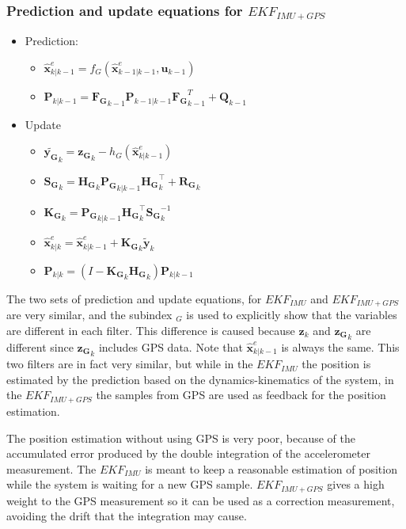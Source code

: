 \documentclass[conference]{IEEEtran}
\begin{document}
\subsubsection{Prediction and update equations for $EKF_{IMU+GPS}$}
\begin{itemize}
	\item Prediction:
	\begin{itemize}
		\item $\hat{\mathbf{x}}_{k|k-1}^e = f_{G}(\hat{\mathbf{x}}_{k-1|k-1}^e, \mathbf{u}_{k-1})$
		\item $ \mathbf{P}_{k|k-1} =  {{\mathbf{F_{G}}_{k-1}}} \mathbf{P}_{k-1|k-1}{  {\mathbf{F_{G}}_{k-1}^T}} + \mathbf{Q}_{k-1} $
	\end{itemize}
	\item Update
	\begin{itemize}
		\item $\mathbf{\tilde{y_G}}_{k} = \mathbf{z_{G}}_{k} - h_G(\hat{\mathbf{x}}_{k|k-1}^e)$
		\item $\mathbf{S_{G}}_{k} = { \mathbf{H_{G}}_{k}}\mathbf{P_{G}}_{k|k-1}{ \mathbf{H_{G}}_{k}^\top} + \mathbf{R_{G}}_{k}$
		\item $\mathbf{K_{G}}_{k} = \mathbf{P_{G}}_{k|k-1}{ \mathbf{H_{G}}_{k}^\top}\mathbf{S_{G}}_{k}^{-1} $
		\item $\hat{\mathbf{x}}_{k|k}^e = \hat{\mathbf{x}}_{k|k-1}^e + \mathbf{K_{G}}_{k}\tilde{\mathbf{y}}_{k} $
		\item $ \mathbf{P}_{k|k} = (I - \mathbf{K_{G}}_{k} { \mathbf{H_{G}}_{k}}) \mathbf{P}_{k|k-1} $
	\end{itemize}
\end{itemize}
The two sets of prediction and update equations, for $EKF_{IMU}$ and $EKF_{IMU+GPS}$ are very similar, and the subindex $_G$ is used to explicitly show that the variables are different in each filter. This difference is caused because $\mathbf{z}_{k}$ and $\mathbf{z_G}_{k}$ are different since $\mathbf{z_G}_{k}$ includes GPS data. Note that $\hat{\mathbf{x}}_{k|k-1}^e$ is always the same. This two filters are in fact very similar, but while in the $EKF_{IMU}$ the position is estimated by the prediction based on the dynamics-kinematics of the system, in the $EKF_{IMU+GPS}$ the samples from GPS are used as feedback for the position estimation. 

The position estimation without using GPS is very poor, because of the accumulated error produced by the double integration of the accelerometer measurement. The $EKF_{IMU}$ is meant to keep a reasonable estimation of position while the system is waiting for a new GPS sample. $EKF_{IMU+GPS}$ gives a high weight to the GPS measurement so it can be used as a correction measurement, avoiding the drift that the integration may cause.
\end{document}
